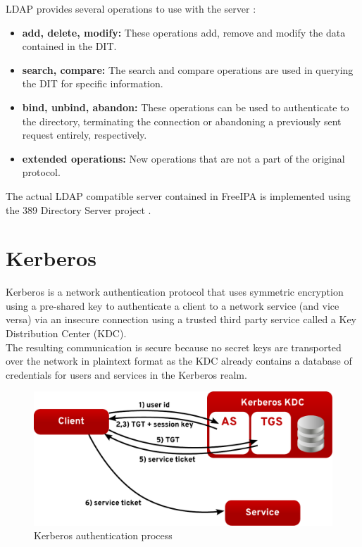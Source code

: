 \clearpage
LDAP provides several operations to use with the server \cite{ldapRFC}:

\begin{itemize}
    \item \textbf{add, delete, modify:} These operations add, remove and modify the data contained in the DIT.
    \item \textbf{search, compare:} The search and compare operations are used in querying the DIT for specific information.
    \item \textbf{bind, unbind, abandon:} These operations can be used to authenticate to the directory, terminating the connection or abandoning a previously sent request entirely, respectively.
    \item \textbf{extended operations:} New operations that are not a part of the original protocol.
\end{itemize}

The actual LDAP compatible server contained in FreeIPA is implemented using the 389 Directory Server project \cite{ldapWeb}.

\section{Kerberos}
Kerberos \cite{kerbRFC} is a network authentication protocol that uses symmetric encryption using a pre-shared key to authenticate a client to a network service (and vice versa) via an insecure connection using a trusted third party service called a Key Distribution Center (KDC). \\
The resulting communication is secure because no secret keys are transported over the network in plaintext format as the KDC already contains a database of credentials for users and services in the Kerberos realm. \\

\begin{figure}[!ht]
    \centering
        \includegraphics[scale=0.6]{fig/kerb}
    \caption{Kerberos authentication process}
    \label{fig:kerb}
\end{figure}

